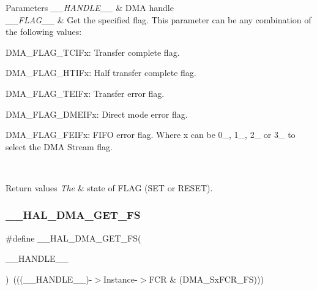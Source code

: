 \begin{DoxyParams}{Parameters}
{\em \+\_\+\+\_\+\+H\+A\+N\+D\+L\+E\+\_\+\+\_\+} & D\+MA handle \\
\hline
{\em \+\_\+\+\_\+\+F\+L\+A\+G\+\_\+\+\_\+} & Get the specified flag. This parameter can be any combination of the following values\+: \begin{DoxyItemize}
\item D\+M\+A\+\_\+\+F\+L\+A\+G\+\_\+\+T\+C\+I\+Fx\+: Transfer complete flag. \item D\+M\+A\+\_\+\+F\+L\+A\+G\+\_\+\+H\+T\+I\+Fx\+: Half transfer complete flag. \item D\+M\+A\+\_\+\+F\+L\+A\+G\+\_\+\+T\+E\+I\+Fx\+: Transfer error flag. \item D\+M\+A\+\_\+\+F\+L\+A\+G\+\_\+\+D\+M\+E\+I\+Fx\+: Direct mode error flag. \item D\+M\+A\+\_\+\+F\+L\+A\+G\+\_\+\+F\+E\+I\+Fx\+: F\+I\+FO error flag. Where x can be 0\+\_, 1\+\_, 2\+\_ or 3\+\_ to select the D\+MA Stream flag. ~\newline
\end{DoxyItemize}
\\
\hline
\end{DoxyParams}

\begin{DoxyRetVals}{Return values}
{\em The} & state of F\+L\+AG (S\+ET or R\+E\+S\+ET). \\
\hline
\end{DoxyRetVals}
\mbox{\label{group___d_m_a_ga8f0ff408d25904040b9d23ee7f6af080}} 
\subsubsection{\texorpdfstring{\+\_\+\+\_\+\+H\+A\+L\+\_\+\+D\+M\+A\+\_\+\+G\+E\+T\+\_\+\+FS}{\_\_HAL\_DMA\_GET\_FS}}
{\footnotesize\ttfamily \#define \+\_\+\+\_\+\+H\+A\+L\+\_\+\+D\+M\+A\+\_\+\+G\+E\+T\+\_\+\+FS(\begin{DoxyParamCaption}\item[{}]{\+\_\+\+\_\+\+H\+A\+N\+D\+L\+E\+\_\+\+\_\+ }\end{DoxyParamCaption})~(((\+\_\+\+\_\+\+H\+A\+N\+D\+L\+E\+\_\+\+\_\+)-\/$>$Instance-\/$>$F\+CR \& (D\+M\+A\+\_\+\+Sx\+F\+C\+R\+\_\+\+FS)))}



